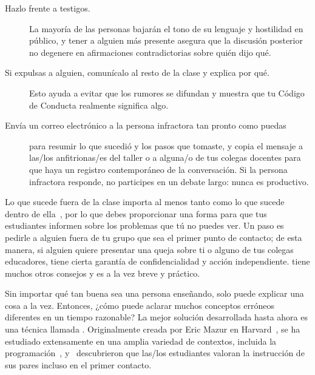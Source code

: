 \begin{description}

\item[Hazlo frente a testigos.]
  La mayoría de las personas bajarán el tono de su lenguaje y hostilidad en público,
  y tener a alguien más presente asegura que
  la discusión posterior no degenere en afirmaciones contradictorias sobre quién dijo qué.

\item[Si expulsas a alguien, comunícalo al resto de la clase y explica por qué.]
  Esto ayuda a evitar que los rumores se difundan
  y muestra que tu Código de Conducta realmente significa algo.

\item[Envía un correo electrónico a la persona infractora tan pronto como puedas]
  para resumir lo que sucedió y los pasos que tomaste,
  y copia el mensaje a las/los anfitrionas/es del taller o a alguna/o de tus colegas docentes
  para que haya un registro contemporáneo de la conversación.
  Si la persona infractora responde,
  no participes en un debate largo:
  nunca es productivo.
 
\end{description}

Lo que sucede fuera de la clase importa al menos tanto como lo que sucede dentro de ella~\cite{Part2011},
por lo que debes proporcionar una forma para que tus estudiantes informen sobre los problemas que tú no puedes ver.
Un paso es pedirle a alguien fuera de tu grupo que sea el primer punto de contacto;
de esta manera,
si alguien quiere presentar una queja sobre ti o alguno de tus colegas educadores,
tiene cierta garantía de confidencialidad y acción independiente.
\cite{Auro2019} tiene muchos otros consejos
y es a la vez breve y práctico.


Sin importar qué tan buena sea una persona enseñando,
solo puede explicar una cosa a la vez.
Entonces, ¿cómo puede aclarar muchos conceptos erróneos diferentes en un tiempo razonable?
La mejor solución desarrollada hasta ahora es una técnica llamada .
Originalmente creada por Eric Mazur en Harvard~\cite{Mazu1996},
se ha estudiado extensamente en una amplia variedad de contextos,
incluida la programación~\cite{Crou2001,Port2013},
y~\cite{Port2016} descubrieron que las/los estudiantes valoran la instrucción de sus pares incluso en el primer contacto.

